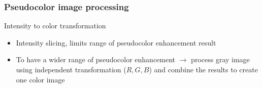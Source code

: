 \documentclass{beamer}
\begin{document}
\begin{frame}
\frametitle{Pseudocolor image processing}
\begin{block}{Intensity to color transformation}
\begin{itemize}
\item Intensity slicing, limits range of pseudocolor enhancement result
\item To have a wider range of pseudocolor enhancement $\rightarrow$ process gray image using independent transformation ($R,G,B$) and combine the results to create one color image
\end{itemize}
\end{block}
\end{frame}
\end{document}
